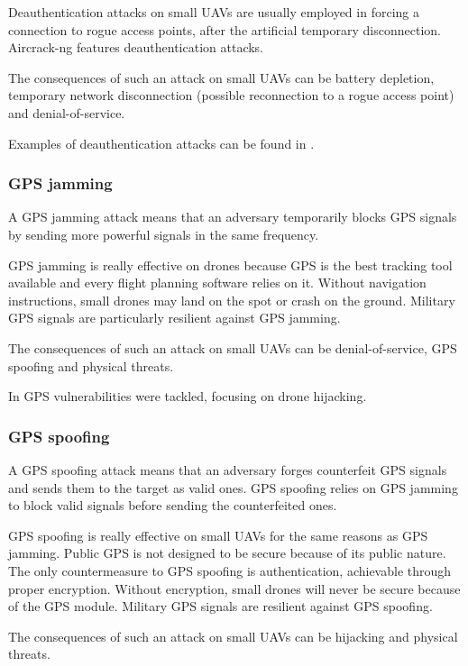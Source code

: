 \documentclass[journal]{IEEEtran}
\begin{document}
Deauthentication attacks on small UAVs are usually employed in forcing a connection to rogue access points, after the artificial temporary disconnection. Aircrack-ng \cite{aircrackng} features deauthentication attacks.

The consequences of such an attack on small UAVs can be battery depletion, temporary network disconnection (possible reconnection to a rogue access point) and denial-of-service.

Examples of deauthentication attacks can be found in \cite{publicsafetynetworksecurity} \cite{smartcitiesdronesecurity}.

\subsubsection{GPS jamming}
A GPS jamming attack means that an adversary temporarily blocks GPS signals by sending more powerful signals in the same frequency.

GPS jamming is really effective on drones because GPS is the best tracking tool available and every flight planning software relies on it. Without navigation instructions, small drones may land on the spot or crash on the ground. Military GPS signals are particularly resilient against GPS jamming.

The consequences of such an attack on small UAVs can be denial-of-service, GPS spoofing and physical threats.

In \cite{anatomyspoofing} GPS vulnerabilities were tackled, focusing on drone hijacking.

\subsubsection{GPS spoofing}
A GPS spoofing attack means that an adversary forges counterfeit GPS signals and sends them to the target as valid ones. GPS spoofing relies on GPS jamming to block valid signals before sending the counterfeited ones.

GPS spoofing is really effective on small UAVs for the same reasons as GPS jamming. Public GPS is not designed to be secure because of its public nature. The only countermeasure to GPS spoofing is authentication, achievable through proper encryption. Without encryption, small drones will never be secure because of the GPS module. Military GPS signals are resilient against GPS spoofing.

The consequences of such an attack on small UAVs can be hijacking and physical threats.
\end{document}
